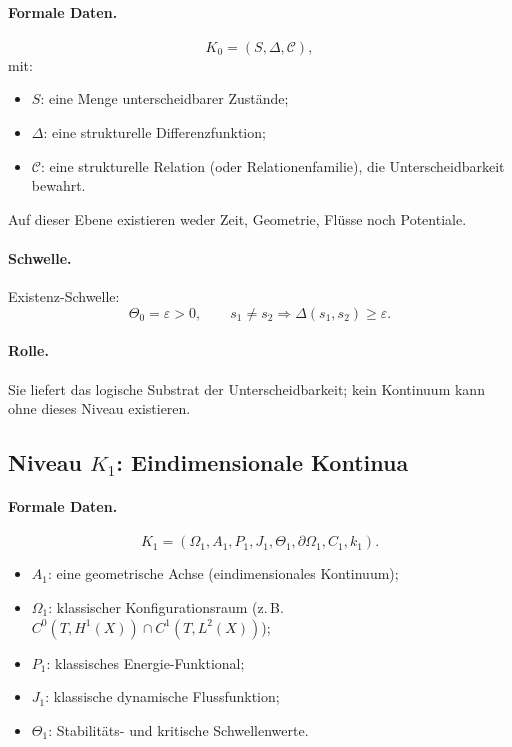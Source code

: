 \paragraph{Formale Daten.}
\[
    K_0 = (S,\Delta,\mathcal{C}),
\]
mit:
\begin{itemize}
    \item \(S\): eine Menge unterscheidbarer Zustände;
    \item \(\Delta\): eine strukturelle Differenzfunktion;
    \item \(\mathcal{C}\): eine strukturelle Relation (oder Relationenfamilie),
          die Unterscheidbarkeit bewahrt.
\end{itemize}

Auf dieser Ebene existieren weder Zeit, Geometrie, Flüsse noch Potentiale.

\paragraph{Schwelle.}
Existenz-Schwelle:
\[
   \Theta_0 = \varepsilon > 0,
   \qquad
   s_1 \neq s_2 \Rightarrow \Delta(s_1,s_2) \ge \varepsilon.
\]

\paragraph{Rolle.}
Sie liefert das logische Substrat der Unterscheidbarkeit;
kein Kontinuum kann ohne dieses Niveau existieren.

\subsection{Niveau \texorpdfstring{\texorpdfstring{$K_1$}{K\_1}}{K1}: Eindimensionale Kontinua}

\paragraph{Formale Daten.}
\[
    K_1 = (\Omega_1, A_1, P_1, J_1, \Theta_1,
           \partial\Omega_1, C_1, k_1).
\]

\begin{itemize}
    \item \(A_1\): eine geometrische Achse (eindimensionales Kontinuum);
    \item \(\Omega_1\): klassischer Konfigurationsraum
          (z.\,B. \(C^0(T,H^1(X))\cap C^1(T,L^2(X))\));
    \item \(P_1\): klassisches Energie-Funktional;
    \item \(J_1\): klassische dynamische Flussfunktion;
    \item \(\Theta_1\): Stabilitäts- und kritische Schwellenwerte.
\end{itemize}

